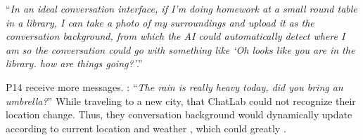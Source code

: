 ``\textit{In an ideal conversation interface, if I'm doing homework at a small round table in a library, I can take a photo of my surroundings and upload it as the conversation background, from which the AI could automatically detect where I am so the conversation could go with something like `Oh looks like you are in the library. how are things going?'}.''

P14  receive more  messages. : ``\textit{The rain is really heavy today, did you bring an umbrella?}'' 
 While traveling to a new city,  that ChatLab could not recognize their location change. Thus, they  conversation background  would dynamically update according to  current location and weather , which could greatly .

